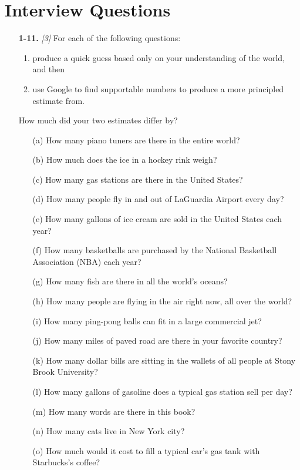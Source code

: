 \documentclass[10pt]{article}
\begin{document}
\section*{Interview Questions}
\begin{enumerate}
    \setcounter{enumi}{10}
    \item [\textbf{1-11.}] \textit{[3] } For each of the following questions: 
    \begin{enumerate}
        \item produce a quick guess based only on your understanding of the world, and then 
        \item use Google to find supportable numbers to produce a more principled estimate from.
    \end{enumerate}
    How much did your two estimates differ by?
    \begin{enumerate}
        \item [(a)] How many piano tuners are there in the entire world?
        \item [(b)] How much does the ice in a hockey rink weigh?
        \item [(c)] How many gas stations are there in the United States?
        \item [(d)] How many people fly in and out of LaGuardia Airport every day?
        \item [(e)] How many gallons of ice cream are sold in the United States each year?
        \item [(f)] How many basketballs are purchased by the National Basketball Association (NBA) each year?
        \item [(g)] How many fish are there in all the world's oceans?
        \item [(h)] How many people are flying in the air right now, all over the world?
        \item [(i)] How many ping-pong balls can fit in a large commercial jet?
        \item [(j)] How many miles of paved road are there in your favorite country?
        \item [(k)] How many dollar bills are sitting in the wallets of all people at Stony Brook University?
        \item [(l)] How many gallons of gasoline does a typical gas station sell per day?
        \item [(m)] How many words are there in this book?
        \item [(n)] How many cats live in New York city?
        \item [(o)] How much would it cost to fill a typical car's gas tank with Starbucks's coffee?

\end{enumerate}
\end{enumerate}
\end{document}
